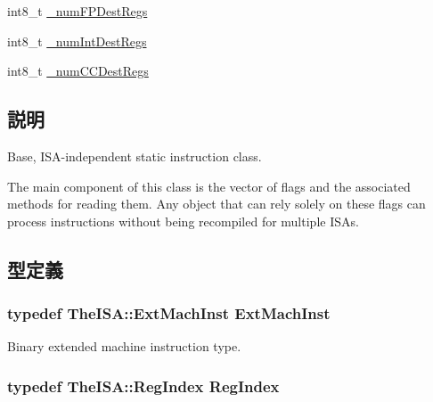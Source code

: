 \begin{Indent}{\bf }\par
{\em \label{_amgrpd41d8cd98f00b204e9800998ecf8427e}
 }\begin{DoxyCompactItemize}
\item 
int8\_\-t \hyperlink{classStaticInst_a4ec6cc7bec2115d9e9cf035b5f1a6417}{\_\-numFPDestRegs}
\item 
int8\_\-t \hyperlink{classStaticInst_a7dd9ab1fe854aac5dfc13be06af528a7}{\_\-numIntDestRegs}
\item 
int8\_\-t \hyperlink{classStaticInst_ae3670a4ffb2403a58b2d3ecc05cc5e38}{\_\-numCCDestRegs}
\end{DoxyCompactItemize}
\end{Indent}


\subsection{説明}
Base, ISA-\/independent static instruction class.

The main component of this class is the vector of flags and the associated methods for reading them. Any object that can rely solely on these flags can process instructions without being recompiled for multiple ISAs. 

\subsection{型定義}
\hypertarget{classStaticInst_a5605d4fc727eae9e595325c90c0ec108}{
\subsubsection[{ExtMachInst}]{\setlength{\rightskip}{0pt plus 5cm}typedef TheISA::ExtMachInst {\bf ExtMachInst}}}
\label{classStaticInst_a5605d4fc727eae9e595325c90c0ec108}


Binary extended machine instruction type. \hypertarget{classStaticInst_a36d25e03e43fa3bb4c5482cbefe5e0fb}{
\subsubsection[{RegIndex}]{\setlength{\rightskip}{0pt plus 5cm}typedef TheISA::RegIndex {\bf RegIndex}}}
\label{classStaticInst_a36d25e03e43fa3bb4c5482cbefe5e0fb}


